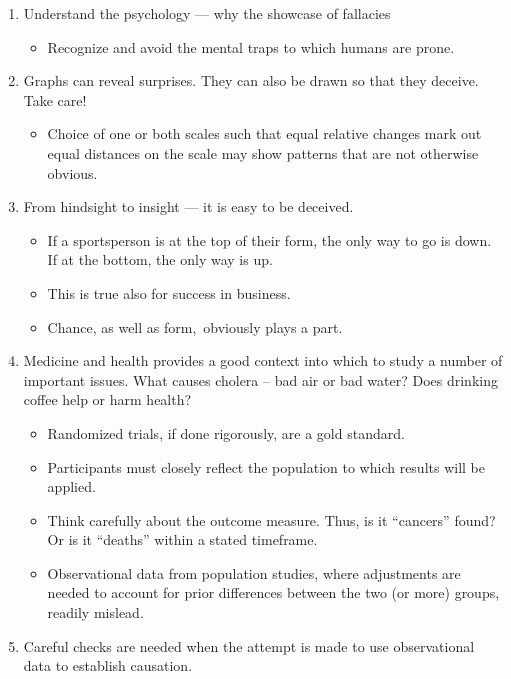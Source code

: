 \documentclass[
  10pt,
  b5paper]{book}
\providecommand{\tightlist}{%
  \setlength{\itemsep}{0pt}\setlength{\parskip}{0pt}}
\begin{document}
\begin{enumerate}
\def\labelenumi{\arabic{enumi}.}
\tightlist
\item
  Understand the psychology --- why the showcase of fallacies

  \begin{itemize}
  \tightlist
  \item
    Recognize and avoid the mental traps to which humans are prone.
  \end{itemize}
\item
  Graphs can reveal surprises. They can also be drawn
  so that they deceive. Take care!

  \begin{itemize}
  \tightlist
  \item
    Choice of one or both scales such that equal relative
    changes mark out equal distances on the scale may show
    patterns that are not otherwise obvious.
  \end{itemize}
\item
  From hindsight to insight --- it is easy to be deceived.

  \begin{itemize}
  \tightlist
  \item
    If a sportsperson is at the top of their form, the only
    way to go is down. If at the bottom, the only way is up.
  \item
    This is true also for success in business.
  \item
    Chance, as well as form,~obviously plays a part.
  \end{itemize}
\item
  Medicine and health provides a good context into which to study
  a number of important issues. What causes cholera -- bad air or bad water?
  Does drinking coffee help or harm health?

  \begin{itemize}
  \tightlist
  \item
    Randomized trials, if done rigorously, are a gold standard.
  \item
    Participants must closely reflect the population to which
    results will be applied.
  \item
    Think carefully about the outcome measure. Thus, is it
    ``cancers'' found? Or is it ``deaths'' within a stated timeframe.
  \item
    Observational data from population studies, where adjustments
    are needed to account for prior differences between the two (or
    more) groups, readily mislead.
  \end{itemize}
\item
  Careful checks are needed when the attempt is made to use
  observational data to establish causation.


\end{enumerate}
\end{document}
